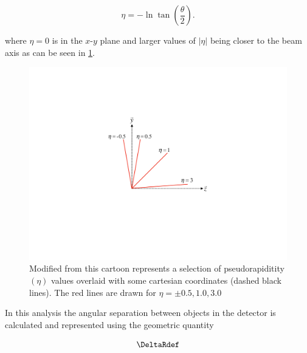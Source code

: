 \begin{equation}
 \eta = -\ln \tan \left( \frac{\theta}{2} \right).
\end{equation}

where $\eta = 0$ is in the $x$-$y$ plane and larger values of $|\eta|$ being
closer to the beam axis as can be seen in \cref{fig:pseudorapidity}.

\begin{figure}[!htbp]
  \begin{center}
    \includegraphics[width=0.5\linewidth]{figures/atlas/pseudorapidity}
    \caption{Modified from \cite{Stark:2317296} this cartoon represents a
selection of pseudorapiditity $(\eta)$ values overlaid with some cartesian
coordinates (dashed black lines).  The red lines are drawn for $\eta = \pm
0.5,1.0,3.0$ }
    \label{fig:pseudorapidity}
  \end{center}
\end{figure}

In this analysis the angular separation between objects in the detector is
calculated and represented using the geometric quantity 

\begin{equation}
 \DeltaRdef
\end{equation}
